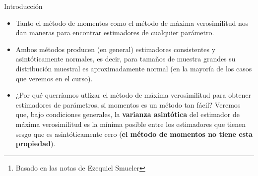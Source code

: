 \documentclass{beamer}
\title{\color{black}{Análisis Estadístico}}
\subtitle{\color{rosee}M\'etodo de estimaci\'on de m\'axima verosimilitud\footnote{Basado en las notas de Ezequiel Smucler}}
\institute[]{UTDT}
\date[UTDT 2021]{}
\theoremstyle{definition}
\begin{document}
\begin{frame}
  \titlepage
\end{frame}




\begin{frame}{\color{rosee}Introducción}\small
\begin{itemize}
    \item Tanto el método de momentos como el método de máxima verosimilitud nos dan maneras para encontrar estimadores de cualquier parámetro.
\item Ambos métodos producen (en general) estimadores consistentes y asintóticamente normales, es decir, para tama\~nos
    de muestra grandes su distribuci\'on muestral es aproximadamente
    normal (en la mayoría de los casos que veremos en el curso).


  

  \item  ¿Por qu\'e querr\'iamos utlizar el método de m\'axima verosimilitud para obtener estimadores de parámetros, si momentos
    es un método tan f\'acil? Veremos que, bajo condiciones generales, la \textbf{varianza asint\'otica}
    del estimador de m\'axima verosimilitud es la m\'inima posible entre
    los estimadores que tienen sesgo que es asintóticamente cero
    (\textbf{el método de momentos no tiene esta propiedad}).
    

\end{itemize}
\end{frame}
\end{document}

